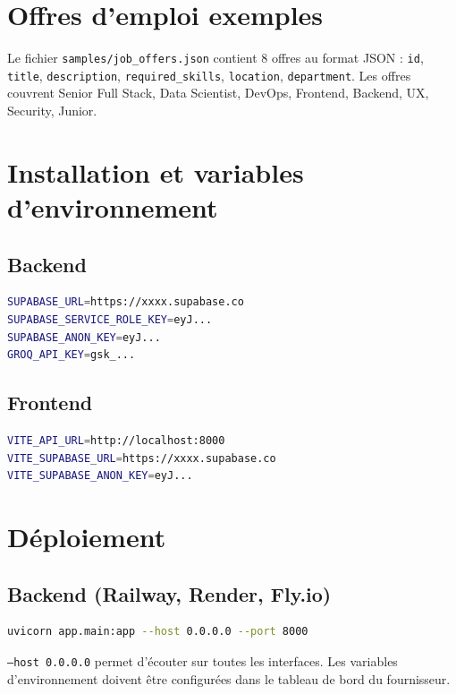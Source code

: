 \documentclass[11pt,a4paper]{report}
\begin{document}
\section{Offres d'emploi exemples}

Le fichier \texttt{samples/job\_offers.json} contient 8 offres au format JSON : \texttt{id}, \texttt{title}, \texttt{description}, \texttt{required\_skills}, \texttt{location}, \texttt{department}. Les offres couvrent Senior Full Stack, Data Scientist, DevOps, Frontend, Backend, UX, Security, Junior.

\section{Installation et variables d'environnement}

\subsection{Backend}

\begin{lstlisting}[caption={backend/.env}, language=bash]
SUPABASE_URL=https://xxxx.supabase.co
SUPABASE_SERVICE_ROLE_KEY=eyJ...
SUPABASE_ANON_KEY=eyJ...
GROQ_API_KEY=gsk_...
\end{lstlisting}

\subsection{Frontend}

\begin{lstlisting}[caption={frontend/.env}, language=bash]
VITE_API_URL=http://localhost:8000
VITE_SUPABASE_URL=https://xxxx.supabase.co
VITE_SUPABASE_ANON_KEY=eyJ...
\end{lstlisting}

\section{Déploiement}

\subsection{Backend (Railway, Render, Fly.io)}

\begin{lstlisting}[language=bash]
uvicorn app.main:app --host 0.0.0.0 --port 8000
\end{lstlisting}

\texttt{--host 0.0.0.0} permet d'écouter sur toutes les interfaces. Les variables d'environnement doivent être configurées dans le tableau de bord du fournisseur.
\end{document}
